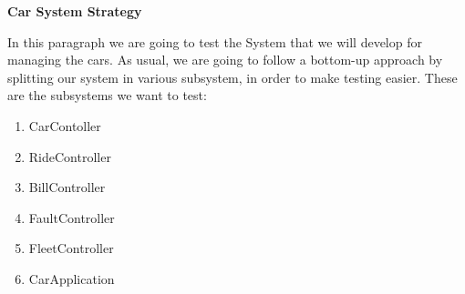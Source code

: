 \documentclass{article}
\begin{document}
\begin{Large}
\textbf{Car System Strategy}
\end{Large}
In this paragraph we are going to test the System that we will develop for managing the cars. As usual, we are going to follow a bottom-up approach by splitting our system in various subsystem, in order to make testing easier. These are the subsystems we want to test:

\begin{enumerate}
\item CarContoller
\item RideController
\item BillController
\item FaultController
\item FleetController
\item CarApplication
\end{enumerate}
\end{document}
